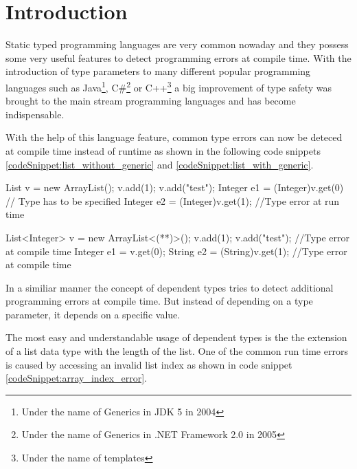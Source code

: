 \section{Introduction}\label{section:introduction}
Static typed programming languages are very common nowaday and they possess some very useful features to detect programming errors at compile time.
With the introduction of type parameters to many different popular programming languages such as Java\footnote{Under the name of Generics in JDK 5 in 2004\cite{JDK5}},
 C\#\footnote{Under the name of Generics in .NET Framework 2.0 in 2005\cite{dotnet20}} or C++\footnote{Under the name of templates} a big improvement of type safety was brought to the main stream programming languages and has become indispensable.

With the help of this language feature, common type errors can now be deteced at compile time instead of runtime as shown in the following code snippets \ref{codeSnippet:list_without_generic} and \ref{codeSnippet:list_with_generic}.

\begin{adjustbox}{width=\columnwidth}
\begin{codesnippet}[caption={List without generic argument}, label={codeSnippet:list_without_generic}]
List v = new ArrayList();
v.add(1);
v.add("test");
Integer e1 = (Integer)v.get(0) // Type has to be specified
Integer e2 = (Integer)v.get(1); //Type error at run time
\end{codesnippet}
\end{adjustbox}
\begin{adjustbox}{width=\columnwidth}
\begin{codesnippet}[escapeinside={(*}{*)}, caption={List with type argument}, label={codeSnippet:list_with_generic}]
List<Integer> v = new ArrayList<(**)>();
v.add(1);
v.add("test"); //Type error at compile time
Integer e1 = v.get(0);
String e2 = (String)v.get(1); //Type error at compile time
\end{codesnippet}
\end{adjustbox}

In a similiar manner the concept of dependent types tries to detect additional programming errors at compile time. But instead of depending on a type parameter, it depends on a specific value. 

The most easy and understandable usage of dependent types is the the extension of a list data type with the length of the list. 
One of the common run time errors is caused by accessing an invalid list index as shown in code snippet \ref{codeSnippet:array_index_error}.

